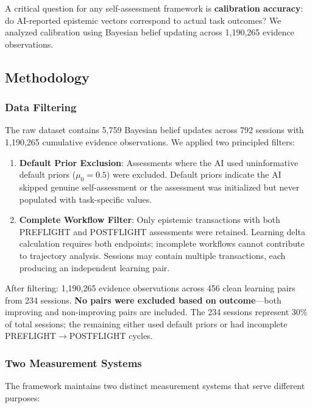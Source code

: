 
A critical question for any self-assessment framework is \textbf{calibration accuracy}: do AI-reported epistemic vectors correspond to actual task outcomes? We analyzed calibration using Bayesian belief updating across 1,190,265 evidence observations.

\subsection{Methodology}

\subsubsection{Data Filtering}

The raw dataset contains 5,759 Bayesian belief updates across 792 sessions with 1,190,265 cumulative evidence observations. We applied two principled filters:

\begin{enumerate}
    \item \textbf{Default Prior Exclusion}: Assessments where the AI used uninformative default priors ($\mu_0 = 0.5$) were excluded. Default priors indicate the AI skipped genuine self-assessment or the assessment was initialized but never populated with task-specific values.

    \item \textbf{Complete Workflow Filter}: Only epistemic transactions with both PREFLIGHT and POSTFLIGHT assessments were retained. Learning delta calculation requires both endpoints; incomplete workflows cannot contribute to trajectory analysis. Sessions may contain multiple transactions, each producing an independent learning pair.
\end{enumerate}

After filtering: 1,190,265 evidence observations across 456 clean learning pairs from 234 sessions. \textbf{No pairs were excluded based on outcome}---both improving and non-improving pairs are included. The 234 sessions represent 30\% of total sessions; the remaining either used default priors or had incomplete PREFLIGHT$\rightarrow$POSTFLIGHT cycles.

\subsubsection{Two Measurement Systems}

The framework maintains two distinct measurement systems that serve different purposes:

